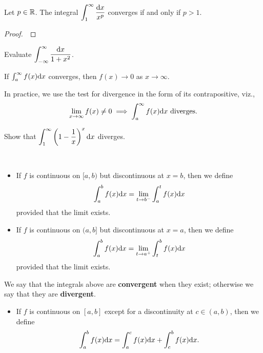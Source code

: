 \newpage

\begin{theorem}
Let $p\in\mathbb R$.
The integral $\displaystyle\int_1^\infty\frac{\mathrm{d} x}{x^p}$ converges if and only if $p>1$.
\end{theorem}
\begin{proof}\,

\vspace{5in}
\end{proof}

\newpage

\begin{example}
Evaluate $\displaystyle\int_{-\infty}^\infty\frac{\mathrm{d} x}{1+x^2}$.
\end{example}

\newpage

\begin{theorem}
If $\int_a^\infty f(x)\mathrm{d} x$ converges, then $f(x)\to 0$ as $x\to\infty$.
\end{theorem}
\begin{remark}
In practice, we use the test for divergence in the form of its contrapositive, viz.,
\begin{equation*}
\lim_{x\to\infty} f(x)\ne 0 \implies \int_a^\infty f(x)\mathrm{d} x \text{ diverges}.
\end{equation*}
\end{remark}

\begin{example}
Show that $\displaystyle\int_1^\infty \left(1-\frac{1}{x}\right)^{x}\mathrm{d} x$ diverges.
\end{example}

\newpage

\begin{definition}\,
\begin{itemize}
\item If $f$ is continuous on $[a,b)$ but discontinuous at $x=b$, then we define
\begin{equation*}
\int_a^b f(x)\mathrm{d} x = \lim_{t\to b^-}\int_a^t f(x)\mathrm{d} x
\end{equation*}
provided that the limit exists.
\item If $f$ is continuous on $(a,b]$ but discontinuous at $x=a$, then we define
\begin{equation*}
\int_{a}^b f(x)\mathrm{d} x = \lim_{t\to a^+}\int_t^b f(x)\mathrm{d} x
\end{equation*}
provided that the limit exists.
\end{itemize}
We say that the integrals above are \textbf{convergent} when they exist; otherwise we say that they are \textbf{divergent}.
\begin{itemize}
\item If $f$ is continuous on $[a,b]$ except for a discontinuity at $c\in (a,b)$, then we define
\begin{equation*}
\int_{a}^b f(x)\mathrm{d} x = \int_{a}^cf(x)\mathrm{d} x + \int_c^b f(x)\mathrm{d} x.
\end{equation*}
\end{itemize}
\end{definition}

